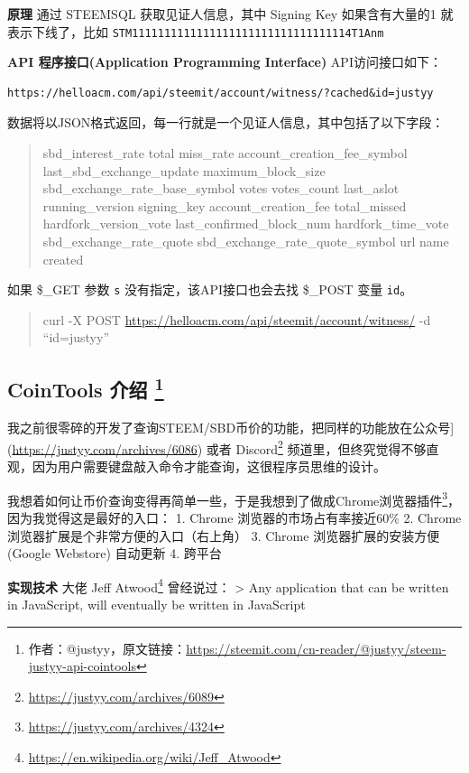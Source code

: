 \documentclass[]{ctexbook}
\renewcommand{\href}[2]{#2\footnote{\url{#1}}}
\begin{document}
\textbf{原理}
通过 STEEMSQL 获取见证人信息，其中 Signing Key 如果含有大量的1 就表示下线了，比如 \texttt{STM1111111111111111111111111111111114T1Anm}

\textbf{API 程序接口(Application Programming Interface)}
API访问接口如下：

\begin{verbatim}
https://helloacm.com/api/steemit/account/witness/?cached&id=justyy
\end{verbatim}

数据将以JSON格式返回，每一行就是一个见证人信息，其中包括了以下字段：

\begin{quote}
sbd\_interest\_rate
total
miss\_rate
account\_creation\_fee\_symbol
last\_sbd\_exchange\_update
maximum\_block\_size
sbd\_exchange\_rate\_base\_symbol
votes
votes\_count
last\_aslot
running\_version
signing\_key
account\_creation\_fee
total\_missed
hardfork\_version\_vote
last\_confirmed\_block\_num
hardfork\_time\_vote
sbd\_exchange\_rate\_quote
sbd\_exchange\_rate\_quote\_symbol
url
name
created
\end{quote}

如果 \$\_GET 参数 \texttt{s} 没有指定，该API接口也会去找 \$\_POST 变量 \texttt{id}。

\begin{quote}
curl -X POST \url{https://helloacm.com/api/steemit/account/witness/} -d ``id=justyy''
\end{quote}

\hypertarget{cointools-}{%
\subsection[CoinTools 介绍 ]{\texorpdfstring{CoinTools 介绍 \footnote{作者：@justyy，原文链接：\url{https://steemit.com/cn-reader/@justyy/steem-justyy-api-cointools}}}{CoinTools 介绍 }}\label{cointools-}}

我之前很零碎的开发了查询STEEM/SBD币价的功能，把同样的功能放在公众号{]}(\url{https://justyy.com/archives/6086}) 或者 \href{https://justyy.com/archives/6089}{Discord} 频道里，但终究觉得不够直观，因为用户需要键盘敲入命令才能查询，这很程序员思维的设计。

我想着如何让币价查询变得再简单一些，于是我想到了做成Chrome\href{https://justyy.com/archives/4324}{浏览器插件}，因为我觉得这是最好的入口：
1. Chrome 浏览器的市场占有率接近60\%
2. Chrome 浏览器扩展是个非常方便的入口（右上角）
3. Chrome 浏览器扩展的安装方便 (Google Webstore) 自动更新
4. 跨平台

\textbf{实现技术}
大佬 \href{https://en.wikipedia.org/wiki/Jeff_Atwood}{Jeff Atwood} 曾经说过：
\textgreater{} Any application that can be written in JavaScript, will eventually be written in JavaScript
\end{document}
